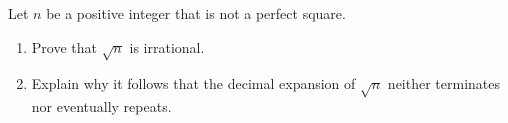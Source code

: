 Let $n$ be a positive integer that is not a perfect square.
\begin{enumerate}
\item[(a)] Prove that $\sqrt n$ is irrational.
\item[(b)] Explain why it follows that the decimal expansion of $\sqrt n$ neither terminates nor eventually repeats.
\end{enumerate}
